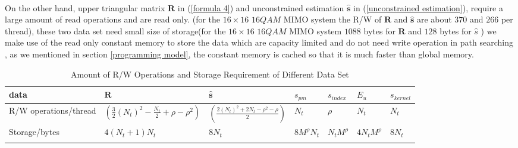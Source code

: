 \documentclass[12pt,a4paper,final]{article}
\begin{document}
\begin{spacing}{2.5}
 \paragraph{} On the other hand, upper triangular matrix $\mathbf{R}$ in (\ref{formula 4})  and unconstrained estimation $\mathbf{\hat{s}}$ in (\ref{unconstrained estimation}), require a large amount of read operations and are read only. (for the $16\times 16$ $16QAM$ MIMO system the R/W of $\mathbf{R}$  and $\mathbf{\hat{s}}$ are about  $370$ and $266$ per thread), these two data set need small size of storage(for the $16\times 16$ $16QAM$ MIMO system $1088$ bytes for $\mathbf{R}$ and $128$ bytes for $\hat{s}$  ) we make use of the read only constant memory to store the data which are capacity limited and do not need write operation in path searching , as we mentioned in section \ref{programming model}, the constant memory is cached so that it is much faster than global memory.
 \begin{table}[htb]  
 \caption{Amount of R/W Operations and Storage Requirement of Different Data Set}
 \centering
\begin{tabular}{|p{3cm}|p{3cm}|l|p{3cm}|l|l|l|}
\hline
data & $\mathbf{R}$ & $\mathbf{\hat{s}}$ & $\mathit{s_{pm}}$ & $\mathit{s_{index}}$ & $\mathit{E_{u}}$ & $\mathit{s_{kernel}}$ \\
\hline
R/W operations/thread & $(\frac{3}{2}(N_{t})^{2}-\frac{N_{t}}{2}+\rho-\rho^{2})$ & $(\frac{2(N_{t})^{2}+2N_{t}-\rho^{2}-\rho}{2})$ & $N_{t}$ & $\rho$ &$N_{t}$ & $N_{t}$ \\
\hline
Storage/bytes  & $4(N_{t}+1)N_{t}$ & $8N_{t}$ & $8M^{\rho}N_{t}$ & $N_{t}M^{\rho}$ & $4N_{t}M^{\rho}$ & $8N_{t}$\\
\hline  \label{amount of R/W operation} 
\end{tabular} 
\end{table} 

\end{spacing}
\end{document}
